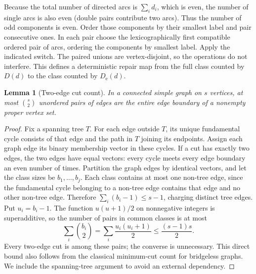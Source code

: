 \documentclass[11pt]{article}
\newtheorem{lemma}[theorem]{Lemma}
\theoremstyle{remark}\newtheorem{remark}[theorem]{Remark}
\newcommand{\De}{D_{\mathrm e}}
\begin{document}
Because the total number of directed arcs is $\sum_i d_i$, which is even, the number of single arcs is also even (double pairs contribute two arcs). Thus the number of odd components is even. Order those components by their smallest label and pair consecutive ones. In each pair choose the lexicographically first compatible ordered pair of arcs, ordering the components by smallest label. Apply the indicated switch. The paired unions are vertex-disjoint, so the operations do not interfere. This defines a deterministic repair map from the full class counted by $D(d)$ to the class counted by $\De(d)$.

\begin{lemma}[Two-edge cut count]\label{lem:cutpairs}
In a connected simple graph on $s$ vertices, at most $\binom{s}{2}$ unordered pairs of edges are the entire edge boundary of a nonempty proper vertex set.
\end{lemma}
\begin{proof}
Fix a spanning tree $T$. For each edge outside $T$, its unique fundamental cycle consists of that edge and the path in $T$ joining its endpoints. Assign each graph edge its binary membership vector in these cycles. If a cut has exactly two edges, the two edges have equal vectors: every cycle meets every edge boundary an even number of times. Partition the graph edges by identical vectors, and let the class sizes be $b_1,\ldots,b_j$. Each class contains at most one non-tree edge, since the fundamental cycle belonging to a non-tree edge contains that edge and no other non-tree edge. Therefore $\sum_i(b_i-1)\le s-1$, charging distinct tree edges. Put $u_i=b_i-1$. The function $u(u+1)/2$ on nonnegative integers is superadditive, so the number of pairs in common classes is at most
\[
 \sum_i\binom{b_i}{2}=\sum_i\frac{u_i(u_i+1)}2
 \le \frac{(s-1)s}{2}.
\]
Every two-edge cut is among these pairs; the converse is unnecessary. This direct bound also follows from the classical minimum-cut count for bridgeless graphs. We include the spanning-tree argument to avoid an external dependency.
\end{proof}
\end{document}
